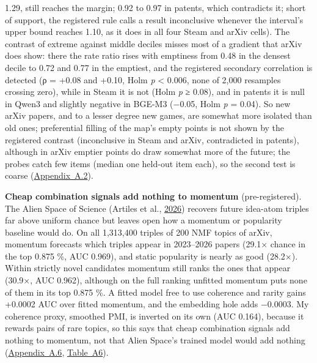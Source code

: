 \documentclass[
  10pt,
]{article}
\begin{document}
1.29, still reaches the margin; 0.92 to
0.97 in patents, which contradicts it;
short of support, the registered rule
calls a result inconclusive whenever the
interval's upper bound reaches 1.10, as
it does in all four Steam and arXiv
cells). The contrast of extreme against
middle deciles misses most of a gradient
that arXiv does show: there the rate
ratio rises with emptiness from 0.48 in
the densest decile to 0.72 and 0.77 in
the emptiest, and the registered
secondary correlation is detected (ρ =
+0.08 and +0.10, Holm \emph{p}
\textless{} 0.006, none of 2,000
resamples crossing zero), while in Steam
it is not (Holm \emph{p} ≥ 0.08), and in
patents it is null in Qwen3 and slightly
negative in BGE-M3 (−0.05, Holm \emph{p}
= 0.04). So new arXiv papers, and to a
lesser degree new games, are somewhat
more isolated than old ones;
preferential filling of the map's empty
points is not shown by the registered
contrast (inconclusive in Steam and
arXiv, contradicted in patents),
although in arXiv emptier points do draw
somewhat more of the future; the probes
catch few items (median one held-out
item each), so the second test is coarse
(\hyperref[app:A.2]{Appendix~A.2}).

\textbf{Cheap combination signals add
nothing to momentum} (pre-registered).
The Alien Space of Science (Artiles et
al., \hyperlink{ref-Artiles2026}{2026})
recovers future idea-atom triples far
above uniform chance but leaves open how
a momentum or popularity baseline would
do. On all 1,313,400 triples of 200 NMF
topics of arXiv, momentum forecasts
which triples appear in 2023--2026
papers (29.1× chance in the top 0.875
\%, AUC 0.969), and static popularity is
nearly as good (28.2×). Within strictly
novel candidates momentum still ranks
the ones that appear (30.9×, AUC 0.962),
although on the full ranking unfitted
momentum puts none of them in its top
0.875 \%. A fitted model free to use
coherence and rarity gains +0.0002 AUC
over fitted momentum, and the embedding
hole adds −0.0003. My coherence proxy,
smoothed PMI, is inverted on its own
(AUC 0.164), because it rewards pairs of
rare topics, so this says that cheap
combination signals add nothing to
momentum, not that Alien Space's trained
model would add nothing
(\hyperref[app:A.6]{Appendix~A.6},
\hyperref[tab:A6]{Table~A6}).
\end{document}
